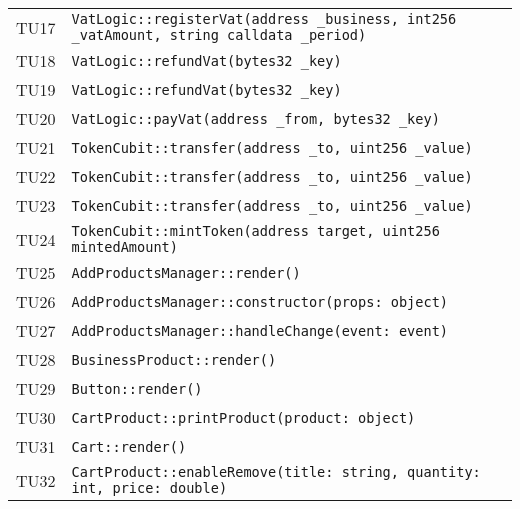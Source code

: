 \begin{longtable}{ >{\centering}p{} >{}p{}}
			\hypertarget{TU17}{TU17} & \texttt{VatLogic::registerVat(address 
			\_business, int256 \_vatAmount, string calldata \_period)}\\
			
			\hypertarget{TU18}{TU18} & \texttt{VatLogic::refundVat(bytes32 
			\_key)}\\
			
			\hypertarget{TU19}{TU19} & \texttt{VatLogic::refundVat(bytes32 
				\_key)}\\
			
			\hypertarget{TU20}{TU20} & \texttt{VatLogic::payVat(address \_from, 
			bytes32 \_key)}\\
			
			\hypertarget{TU21}{TU21} & \texttt{TokenCubit::transfer(address 
			\_to, uint256 \_value)}\\
			
			\hypertarget{TU22}{TU22} & \texttt{TokenCubit::transfer(address 
				\_to, uint256 \_value)}\\
			
			\hypertarget{TU23}{TU23} & \texttt{TokenCubit::transfer(address 
				\_to, uint256 \_value)}\\
			
			\hypertarget{TU24}{TU24} & \texttt{TokenCubit::mintToken(address 
			target, uint256 mintedAmount)}\\
		
			\hypertarget{TU25}{TU25} & \texttt{AddProductsManager::render()}\\
			
			\hypertarget{TU26}{TU26} & 
			\texttt{AddProductsManager::constructor(props: object)}\\
			
			\hypertarget{TU27}{TU27} & 
			\texttt{AddProductsManager::handleChange(event: event)}\\
			
			\hypertarget{TU28}{TU28} & 
			\texttt{BusinessProduct::render()}\\
			
			\hypertarget{TU29}{TU29} & 
			\texttt{Button::render()}\\
			
			\hypertarget{TU30}{TU30} & 
			\texttt{CartProduct::printProduct(product: object)}\\
			
			\hypertarget{TU31}{TU31} & 
			\texttt{Cart::render()}\\
			
			\hypertarget{TU32}{TU32} & 
			\texttt{CartProduct::enableRemove(title: string, quantity: int, 
			price: double)}\\
		

\end{longtable}

